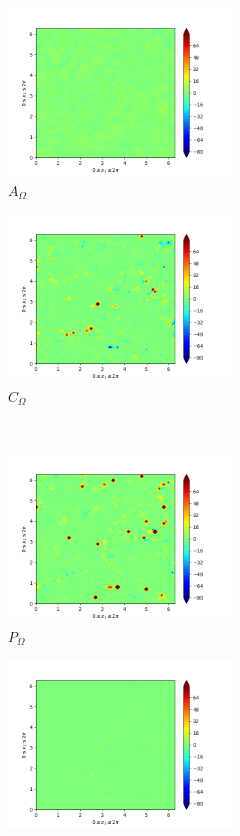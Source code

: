 \begin{figure}[H]
\begin{subfigure}{0.45\textwidth}
        \includegraphics[height=1.75in]{media/run-cds-65/A-enst-1360.png}
        \caption{$A_{\Omega}$}
    \end{subfigure}
    \newline
    \begin{subfigure}{0.45\textwidth}
        \includegraphics[height=1.75in]{media/run-cds-65/Pi-enst-1360.png}
        \caption{$C_{\Omega}$}
    \end{subfigure}
    ~
    \begin{subfigure}{0.45\textwidth}
        \includegraphics[height=1.75in]{media/run-cds-65/P-enst-1360.png}
        \caption{$P_{\Omega}$}
    \end{subfigure}
    \newline
    \begin{subfigure}{0.45\textwidth}
        \includegraphics[height=1.75in]{media/run-cds-65/B-enst-1360.png}

\end{subfigure}
\end{figure}
